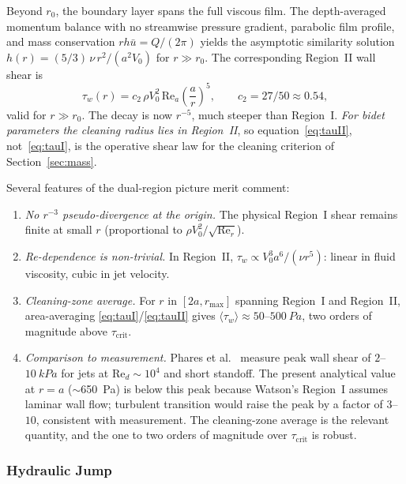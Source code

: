 \documentclass[10pt,letterpaper]{article}
\newcommand{\Rey}{\mathrm{Re}}
\begin{document}
Beyond $r_0$, the boundary layer spans the full viscous film. The
depth-averaged momentum balance with no streamwise pressure gradient,
parabolic film profile, and mass conservation $rh\bar u = Q/(2\pi)$
yields the asymptotic similarity solution $h(r) = (5/3)\,\nu\,r^2/(a^2 V_0)$
for $r \gg r_0$. The corresponding Region~II wall shear is
\begin{equation}
    \boxed{
    \tau_w(r) = c_2\,\rho V_0^2\,\Rey_a\left(\frac{a}{r}\right)^5,
    \qquad c_2 = 27/50 \approx 0.54,
    }
    \label{eq:tauII}
\end{equation}
valid for $r \gg r_0$. The decay is now $r^{-5}$, much steeper than
Region~I. \emph{For bidet parameters the cleaning radius lies in
Region~II}, so equation~\eqref{eq:tauII}, not~\eqref{eq:tauI}, is the
operative shear law for the cleaning criterion of
Section~\ref{sec:mass}.

Several features of the dual-region picture merit comment:
\begin{enumerate}[leftmargin=*, label=(\roman*)]
    \item \emph{No $r^{-3}$ pseudo-divergence at the origin.} The
    physical Region~I shear remains finite at small $r$
    (proportional to $\rho V_0^2/\sqrt{\Rey_r}$).
    \item \emph{Re-dependence is non-trivial.} In Region~II,
    $\tau_w \propto V_0^3 a^6/(\nu r^5)$: linear in fluid viscosity,
    cubic in jet velocity.
    \item \emph{Cleaning-zone average.} For $r$ in $[2a, r_\mathrm{max}]$
    spanning Region~I and Region~II, area-averaging
    \eqref{eq:tauI}/\eqref{eq:tauII} gives
    $\langle\tau_w\rangle \approx 50$--$500~Pa$, two orders of
    magnitude above $\tau_\mathrm{crit}$.
    \item \emph{Comparison to measurement.} Phares et al.~\citep{Phares2000}
    measure peak wall shear of $2$--$10~kPa$ for jets at $\Rey_d
    \sim 10^4$ and short standoff. The present analytical value at
    $r = a$ ($\sim$650~Pa) is below this peak because Watson's
    Region~I assumes laminar wall flow; turbulent transition would
    raise the peak by a factor of $3$--$10$, consistent with measurement.
    The cleaning-zone average is the relevant quantity, and the
    one to two orders of magnitude over $\tau_\mathrm{crit}$ is robust.
\end{enumerate}

\subsubsection{Hydraulic Jump}
\end{document}
